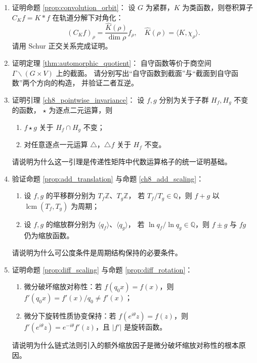 \begin{enumerate}[leftmargin=3em, label=\textbf{题 \arabic*}]
    \item 证明命题 \ref{prop:convolution_orbit}：
    设 $G$ 为紧群，$K$ 为类函数，则卷积算子 $C_K f=K*f$ 在轨道分解下对角化：
    \[
    (C_K f)_\rho=\frac{\hat{K}(\rho)}{\dim\rho}f_\rho,
    \quad
    \hat{K}(\rho)=\langle K,\chi_\rho\rangle.
    \]
    请用 Schur 正交关系完成证明。

    \item 证明定理 \ref{thm:automorphic_quotient}：
    自守函数等价于商空间 $\Gamma\backslash(G\times V)$ 上的截面。
    请分别写出“自守函数到截面”与“截面到自守函数”两个方向的构造，
    并验证二者互逆。

    \item 证明引理 \ref{ch8_pointwise_invariance}：
    设 $f,g$ 分别为关于子群 $H_f,H_g$ 不变的函数，
    $\star$ 为逐点二元运算，则
    \begin{enumerate}[label=(\roman*)]
        \item $f\star g$ 关于 $H_f\cap H_g$ 不变；
        \item 对任意逐点一元运算 $\triangle$，$\triangle f$ 关于 $H_f$ 不变。
    \end{enumerate}
    请说明为什么这一引理是传递性矩阵中代数运算格子的统一证明基础。

    \item 验证命题 \ref{prop:add_translation} 与命题 \ref{ch8_add_scaling}：
    \begin{enumerate}[label=(\roman*)]
        \item 设 $f,g$ 的平移群分别为 $T_f\mathbb{Z}$、$T_g\mathbb{Z}$，
              若 $T_f/T_g\in\mathbb{Q}$，则 $f+g$ 以 $\operatorname{lcm}(T_f,T_g)$ 为周期；
        \item 设 $f,g$ 的缩放群分别为 $\langle q_f\rangle$、$\langle q_g\rangle$，
              若 $\ln q_f/\ln q_g\in\mathbb{Q}$，则 $f\pm g$ 与 $fg$ 仍为缩放函数。
    \end{enumerate}
    请说明为什么可公度条件是周期结构保持的必要条件。

    \item 证明命题 \ref{prop:diff_scaling} 与命题 \ref{prop:diff_rotation}：
    \begin{enumerate}[label=(\roman*)]
        \item 微分破坏缩放对称性：若 $f(q_0x)=f(x)$，则
              $f'(q_0x)=f'(x)/q_0\neq f'(x)$；
        \item 微分下旋转性质协变保持：若 $f(e^{i\theta}z)=f(z)$，则
              $f'(e^{i\theta}z)=e^{-i\theta}f'(z)$，且 $|f'|$ 是旋转函数。
    \end{enumerate}
    请说明为什么链式法则引入的额外缩放因子是微分破坏缩放对称性的根本原因。


\end{enumerate}

